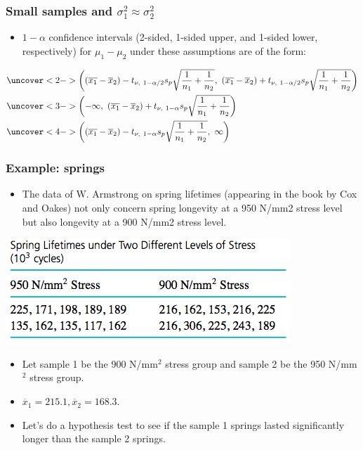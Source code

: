 \documentclass[handout]{beamer}\usepackage{graphicx, color}
\providecommand{\ov}[1]{\overline{#1}}
\numberwithin{equation}{section}
\begin{document}
\begin{frame}
\frametitle{Small samples and $\sigma^2_1 \approx \sigma^2_2$} \scriptsize
\begin{itemize}
\item $1 - \alpha$ confidence intervals (2-sided, 1-sided upper, and 1-sided lower, respectively) for $\mu_1 - \mu_2$ under these assumptions are of the form: 
\end{itemize}
\begin{align*}
&\uncover<2->{\left ((\ov{x_1} - \ov{x}_2) - t_{\nu, \ 1 - \alpha/2} s_p \sqrt{\frac{1}{n_1} + \frac{1}{n_2}} , \ (\ov{x_1} - \ov{x}_2) + t_{\nu, \ 1 - \alpha/2} s_p \sqrt{\frac{1}{n_1} + \frac{1}{n_2}} \right )} \\
&\uncover<3->{\left (-\infty , \ (\ov{x_1} - \ov{x}_2) + t_{\nu, \ 1 - \alpha} s_p \sqrt{\frac{1}{n_1} + \frac{1}{n_2}} \right )} \\
&\uncover<4->{\left ((\ov{x_1} - \ov{x}_2) - t_{\nu, \ 1 - \alpha} s_p \sqrt{\frac{1}{n_1} + \frac{1}{n_2}}, \ \infty \right )}
\end{align*}
\end{frame}






\begin{frame}
\frametitle{Example: springs}
\begin{itemize}
\item The data of W. Armstrong on spring lifetimes (appearing in the book by Cox and Oakes) not only concern spring longevity at a 950 N/mm2 stress level but also longevity at a 900 N/mm2 stress level. 
\end{itemize}
\begin{center}
 \includegraphics{../../fig/springdata.png}
\end{center}
\begin{itemize}
\pause \item Let sample 1 be the 900 N/mm${}^2$ stress group and sample 2 be the 950 N/mm${}^2$ stress group.
\pause \item $\ov{x}_1 = 215.1, \ov{x}_2 = 168.3$.
\pause \item Let's do a hypothesis test to see if the sample 1 springs lasted significantly longer than the sample 2 springs.
\end{itemize}
\end{frame}
\end{document}
